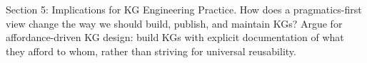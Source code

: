 Section 5: Implications for KG Engineering Practice.
How does a pragmatics-first view change the way we should build, publish, and maintain KGs? Argue for affordance-driven KG design: build KGs with explicit documentation of what they afford to whom, rather than striving for universal reusability.


